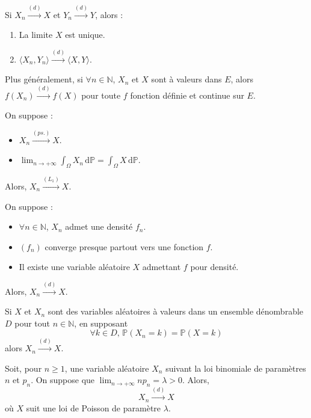 
  \begin{proposition}
    Si $X_n \overset{(d)}{\longrightarrow} X$ et $Y_n \overset{(d)}{\longrightarrow} Y$, alors :
    \begin{enumerate}[label=(\roman*)]
      \item La limite $X$ est unique.
      \item $\langle X_n, Y_n \rangle \overset{(d)}{\longrightarrow} \langle X, Y \rangle$.
    \end{enumerate}
    Plus généralement, si $\forall n \in \mathbb{N}$, $X_n$ et $X$ sont à valeurs dans $E$, alors $f(X_n) \overset{(d)}{\longrightarrow} f(X)$ pour toute $f$ fonction définie et continue sur $E$.
  \end{proposition}

  \begin{theorem}
    On suppose :
    \begin{itemize}
      \item $X_n \overset{(ps.)}{\longrightarrow} X$.
      \item $\lim_{n \rightarrow +\infty} \int_\Omega X_n \, \mathrm{d}\mathbb{P} = \int_\Omega X \, \mathrm{d}\mathbb{P}$.
    \end{itemize}
    Alors, $X_n \overset{(L_1)}{\longrightarrow} X$.
  \end{theorem}

  \begin{corollary}
    On suppose :
    \begin{itemize}
      \item $\forall n \in \mathbb{N}$, $X_n$ admet une densité $f_n$.
      \item $(f_n)$ converge presque partout vers une fonction $f$.
      \item Il existe une variable aléatoire $X$ admettant $f$ pour densité.
    \end{itemize}
    Alors, $X_n \overset{(d)}{\longrightarrow} X$.
  \end{corollary}

  \begin{corollary}
    Si $X$ et $X_n$ sont des variables aléatoires à valeurs dans un ensemble dénombrable $D$ pour tout $n \in \mathbb{N}$, en supposant
    \[ \forall k \in D, \, \mathbb{P}(X_n = k) = \mathbb{P}(X = k) \]
    alors $X_n \overset{(d)}{\longrightarrow} X$.
  \end{corollary}

  \begin{application}
    Soit, pour $n \geq 1$, une variable aléatoire $X_n$ suivant la loi binomiale de paramètres $n$ et $p_n$. On suppose que $\lim_{n \rightarrow +\infty} n p_n = \lambda > 0$.
    Alors,
    \[ X_n \overset{(d)}{\longrightarrow} X \]
    où $X$ suit une loi de Poisson de paramètre $\lambda$.
  \end{application}

